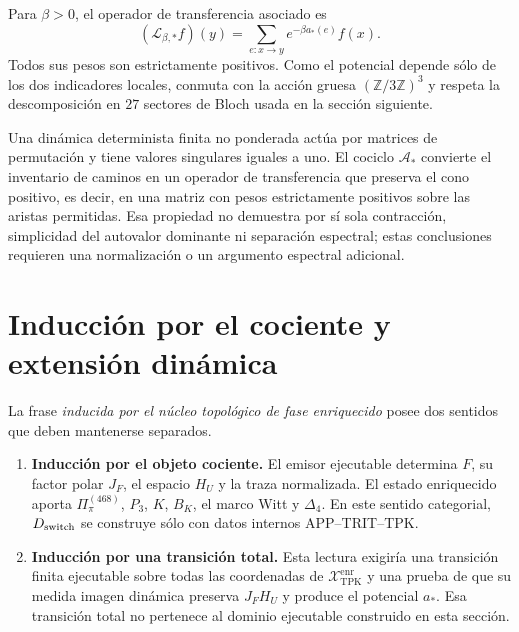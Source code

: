 Para \(\beta>0\), el operador de transferencia asociado es
\[
 (\mathcal L_{\beta,*}f)(y)
 =\sum_{e:x\to y}e^{-\beta a_*(e)}f(x).
\]
Todos sus pesos son estrictamente positivos. Como el potencial depende sólo
de los dos indicadores locales, conmuta con la acción gruesa
\((\mathbb Z/3\mathbb Z)^3\) y respeta la descomposición en \(27\)
sectores de Bloch usada en la sección siguiente.

Una dinámica determinista finita no ponderada actúa por matrices de
permutación y tiene valores singulares iguales a uno. El cociclo
\(\mathcal A_*\) convierte el inventario de caminos en un operador de
transferencia que preserva el cono positivo, es decir, en una matriz con
pesos estrictamente positivos sobre las aristas permitidas. Esa propiedad no
demuestra por sí sola contracción, simplicidad del autovalor dominante ni
separación espectral; estas conclusiones requieren una normalización o un
argumento espectral adicional.

\ifdefined\HMTInternalTraceability
\section{Inducción por el cociente y extensión dinámica}

La frase \emph{inducida por el núcleo topológico de fase enriquecido} posee dos sentidos que deben mantenerse
separados.

\begin{enumerate}
  \item \textbf{Inducción por el objeto cociente.} El emisor ejecutable
  determina \(F\), su factor polar \(J_F\), el espacio \(H_U\) y la
  traza normalizada. El estado enriquecido aporta
  \(\Pi_\pi^{(468)}\), \(P_3\),
  \(K\), \(B_K\), el marco Witt y \(\Delta_4\). En este sentido
  categorial, \(D_{\rm switch}\) se construye sólo con datos internos
  APP--TRIT--TPK\@.
  \item \textbf{Inducción por una transición total.} Esta lectura exigiría
  una transición finita ejecutable sobre todas las coordenadas de
  \(\mathcal X_{\mathrm{TPK}}^{\mathrm{enr}}\) y una prueba de que su
  medida imagen dinámica
  preserva \(J_FH_U\) y produce el potencial \(a_*\). Esa transición total
  no pertenece al dominio ejecutable construido en esta sección.
\end{enumerate}


